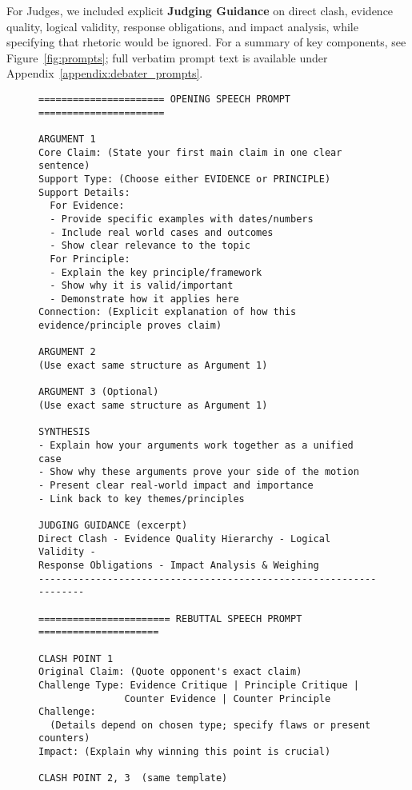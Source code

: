 \documentclass{article}
\begin{document}
For Judges, we included explicit \textbf{Judging Guidance} on direct clash, evidence quality, logical validity, response obligations, and impact analysis, while specifying that rhetoric would be ignored. For a summary of key components, see Figure~\ref{fig:prompts}; full verbatim prompt text is available under Appendix~\ref{appendix:debater_prompts}.

\begin{figure*}[htbp]
  \centering
  \lstset{style=promptstyle}

  \begin{adjustbox}{max height=0.88\textheight}
  \begin{lstlisting}[language={}]
====================== OPENING SPEECH PROMPT ======================

ARGUMENT 1
Core Claim: (State your first main claim in one clear sentence)
Support Type: (Choose either EVIDENCE or PRINCIPLE)
Support Details:
  For Evidence:
  - Provide specific examples with dates/numbers
  - Include real world cases and outcomes
  - Show clear relevance to the topic
  For Principle:
  - Explain the key principle/framework
  - Show why it is valid/important
  - Demonstrate how it applies here
Connection: (Explicit explanation of how this evidence/principle proves claim)

ARGUMENT 2
(Use exact same structure as Argument 1)

ARGUMENT 3 (Optional)
(Use exact same structure as Argument 1)

SYNTHESIS
- Explain how your arguments work together as a unified case
- Show why these arguments prove your side of the motion
- Present clear real-world impact and importance
- Link back to key themes/principles

JUDGING GUIDANCE (excerpt)
Direct Clash - Evidence Quality Hierarchy - Logical Validity -
Response Obligations - Impact Analysis & Weighing
-------------------------------------------------------------------

======================= REBUTTAL SPEECH PROMPT =====================

CLASH POINT 1
Original Claim: (Quote opponent's exact claim)
Challenge Type: Evidence Critique | Principle Critique |
               Counter Evidence | Counter Principle
Challenge:
  (Details depend on chosen type; specify flaws or present counters)
Impact: (Explain why winning this point is crucial)

CLASH POINT 2, 3  (same template)


\end{lstlisting}
\end{adjustbox}
\end{figure*}
\end{document}
